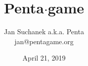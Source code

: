 \documentclass[DIV=19,b5paper,12pt,spanish,russian,french,ngerman,latin,bahasai,english]{scrartcl}
\title{Penta$\cdot$game}
\author{Jan Suchanek a.k.a. Penta\\\makeatletter jan@pentagame.org \makeatother}
\date{April 21, 2019}
\newcommand{\layout}{}
\begin{document}
\maketitle

\tableofcontents

\newpage



\layout
\pagebreak


\layout
\pagebreak


\layout
\pagebreak



\layout
\pagebreak


\layout
\pagebreak


\layout
\pagebreak


\layout
\pagebreak


\layout
\pagebreak


\layout
\pagebreak

\begin{CJK*}{UTF8}{bkai}

\layout
\end{CJK*}
\pagebreak

\begin{CJK*}{UTF8}{gbsn}

\layout
\end{CJK*}

\end{document}
